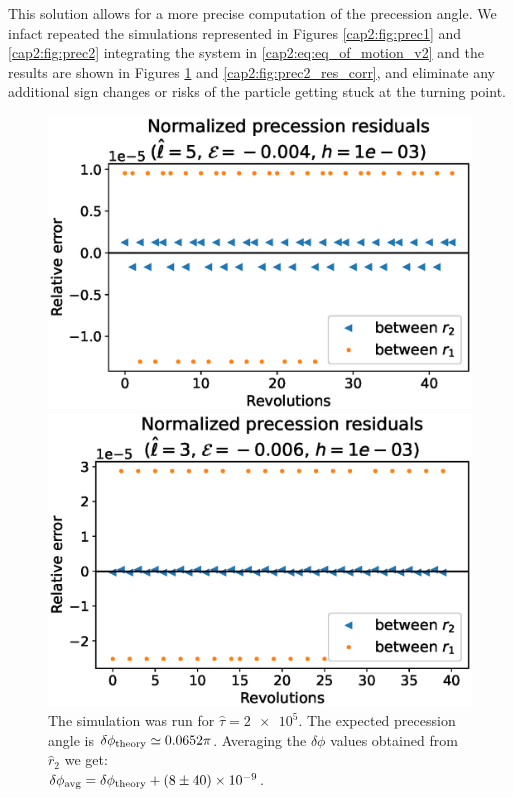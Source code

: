 This solution allows for a more precise computation of the precession angle.
We infact repeated the simulations represented in Figures 
\ref{cap2:fig:prec1} and \ref{cap2:fig:prec2} integrating the system in 
\ref{cap2:eq:eq_of_motion_v2} and the results are shown in Figures
\ref{cap2:fig:prec1_res_corr} and \ref{cap2:fig:prec2_res_corr}, and eliminate
any additional sign changes or risks of the particle getting stuck at the
turning point.

\begin{figure}[h]
    \begin{minipage}{0.48 \textwidth}
        \centering
        \includegraphics[width=\textwidth]{Figures/chapter2/prec1_res_corr.eps}
        \caption{The simulation was run for $\hat \tau = \num{2e5}$.
        The expected precession angle is $\delta \phi_{\rm theory} \simeq 0.0652
        \pi$.
        Averaging the $\delta \phi$ values obtained from $\hat r_2$ we get: \\
        $\delta \phi_{\rm avg} = \delta \phi_{\rm theory} + (8 \pm 40) \times \num{e-9}$.}
        \label{cap2:fig:prec1_res_corr}
    \end{minipage}
    \hspace{0.015 \textwidth}
    \begin{minipage}{0.48 \textwidth}
        \centering
        \includegraphics[width=\textwidth]{Figures/chapter2/prec2_res_corr.eps}

\end{minipage}
\end{figure}
